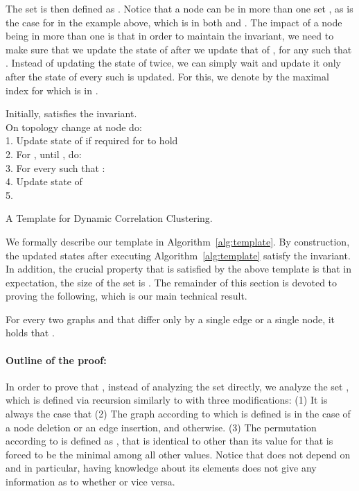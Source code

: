The set  is then defined as . Notice that a node  can be in more than one set , as is the case for  in the example above, which is in both  and . The impact of a node  being in more than one  is that in order to maintain the \MIS invariant, we need to make sure that we update the state of  after we update that of , for any  such that . Instead of updating the state of  twice, we can simply wait and update it only after the state of every such  is updated. For this, we denote by  the maximal index  for which  is in .

\begin{algorithm}
Initially,  satisfies the \MIS invariant.\\
On topology change at node  do:\\
1. Update state of  if required for \MIS to hold\\
2. For , until , do:\\
3. \quad For every  such that :\\
4. \quad\quad Update state of \\
5. \quad 
\caption{A Template for Dynamic Correlation Clustering.}
\label{alg:template}
\end{algorithm}


We formally describe our template in Algorithm~\ref{alg:template}.
By construction, the updated states after executing Algorithm~\ref{alg:template} satisfy the \MIS invariant.
In addition, the crucial property that is satisfied by the above template is that in expectation, the size of the set  is . The remainder of this section is devoted to proving the following, which is our main technical result.

\begin{thm}
\label{thm:ES-const}
For every two graphs  and  that differ only by a single edge or a single node, it holds that  
. 
\end{thm}


\paragraph{Outline of the proof:} In order to prove that , 
instead of analyzing the set  directly, we analyze the set ,  which is defined via recursion similarly to  with three modifications: (1) It is always the case that  (2) The graph according to which  is defined is  in the case of a node deletion or an edge insertion, and  otherwise. (3) The permutation according to  is defined as , that is identical to  other than its value for  that is forced to be the minimal among all other  values. Notice that  does not depend on  and in particular, having knowledge about its elements does not give any information as to whether  or vice versa. 







